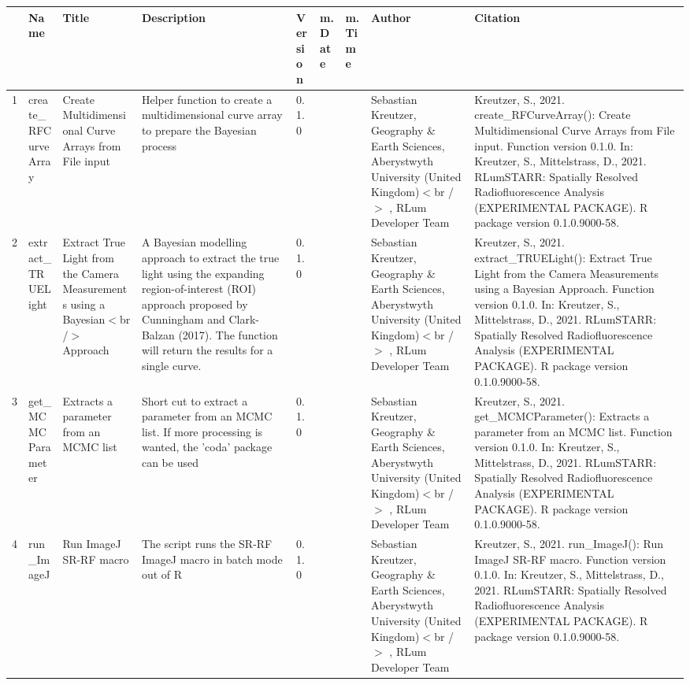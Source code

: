 \begin{table}[ht]
\centering
\begin{tabular}{rllllllll}
  \hline
 & Name & Title & Description & Version & m.Date & m.Time & Author & Citation \\ 
  \hline
1 & create\_RFCurveArray & Create Multidimensional Curve Arrays from File input & Helper function to create a multidimensional curve array to prepare the Bayesian process & 0.1.0
 &  &  & Sebastian Kreutzer, Geography \& Earth Sciences, Aberystwyth University (United Kingdom)$<$br /$>$ , RLum Developer Team & Kreutzer, S., 2021. create\_RFCurveArray(): Create Multidimensional Curve Arrays from File input. Function version 0.1.0. In: Kreutzer, S., Mittelstrass, D., 2021. RLumSTARR: Spatially Resolved Radiofluorescence Analysis (EXPERIMENTAL PACKAGE). R package version 0.1.0.9000-58. 
 \\ 
  2 & extract\_TRUELight & Extract True Light from the Camera Measurements using a Bayesian$<$br /$>$ Approach & A Bayesian modelling approach to extract the true light using the expanding region-of-interest (ROI) approach proposed by Cunningham and Clark-Balzan (2017). The function will return the results for a single curve. & 0.1.0
 &  &  & Sebastian Kreutzer, Geography \& Earth Sciences, Aberystwyth University (United Kingdom)$<$br /$>$ , RLum Developer Team & Kreutzer, S., 2021. extract\_TRUELight(): Extract True Light from the Camera Measurements using a Bayesian Approach. Function version 0.1.0. In: Kreutzer, S., Mittelstrass, D., 2021. RLumSTARR: Spatially Resolved Radiofluorescence Analysis (EXPERIMENTAL PACKAGE). R package version 0.1.0.9000-58. 
 \\ 
  3 & get\_MCMCParameter & Extracts a parameter from an MCMC list & Short cut to extract a parameter from an MCMC list. If more processing is wanted, the  'coda'  package can be used & 0.1.0
 &  &  & Sebastian Kreutzer, Geography \& Earth Sciences, Aberystwyth University (United Kingdom)$<$br /$>$ , RLum Developer Team & Kreutzer, S., 2021. get\_MCMCParameter(): Extracts a parameter from an MCMC list. Function version 0.1.0. In: Kreutzer, S., Mittelstrass, D., 2021. RLumSTARR: Spatially Resolved Radiofluorescence Analysis (EXPERIMENTAL PACKAGE). R package version 0.1.0.9000-58. 
 \\ 
  4 & run\_ImageJ & Run ImageJ SR-RF macro & The script runs the SR-RF ImageJ macro in batch mode out of R & 0.1.0
 &  &  & Sebastian Kreutzer, Geography \& Earth Sciences, Aberystwyth University (United Kingdom)$<$br /$>$ , RLum Developer Team & Kreutzer, S., 2021. run\_ImageJ(): Run ImageJ SR-RF macro. Function version 0.1.0. In: Kreutzer, S., Mittelstrass, D., 2021. RLumSTARR: Spatially Resolved Radiofluorescence Analysis (EXPERIMENTAL PACKAGE). R package version 0.1.0.9000-58. 
 \\ 
   \hline
\end{tabular}
\end{table}

